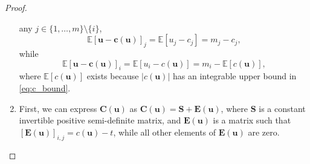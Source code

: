 \documentclass{article}
\theoremstyle{definition}
\begin{document}
\begin{proof}
\begin{enumerate}
    any $j \in \{ 1, \dots, m \} \setminus \{ i \}$,
    \[
      \mathbb{E}[\mathbf{u} - \mathbf{c}(\mathbf{u})]_j = \mathbb{E}[u_j - c_j]
      = m_j - c_j,
    \]
    while
    \[
      \mathbb{E}[\mathbf{u} - \mathbf{c}(\mathbf{u})]_i = \mathbb{E}[u_i
      - c(\mathbf{u})] = m_i - \mathbb{E}[c(\mathbf{u})],
    \]
    where $\mathbb{E}[c(\mathbf{u})]$ exists because $|c(\mathbf{u})|$ has an
    integrable upper bound in \eqref{eq:c_bound}. %
  \item First, we can express $\mathbf{C}(\mathbf{u})$ as
    $\mathbf{C}(\mathbf{u}) = \mathbf{S} + \mathbf{E}(\mathbf{u})$, where
    $\mathbf{S}$ is a constant invertible positive semi-definite matrix, and
    $\mathbf{E}(\mathbf{u})$ is a matrix such that
    $[\mathbf{E}(\mathbf{u})]_{i,j} = c(\mathbf{u}) - t$, while all other
    elements of $\mathbf{E}(\mathbf{u})$ are zero.


\end{enumerate}
\end{proof}
\end{document}
